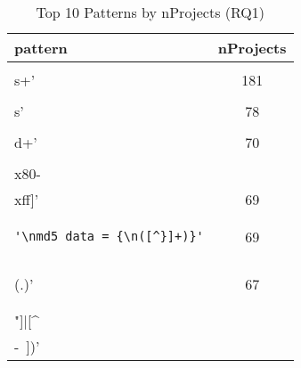 \begin{table}[tb]
\begin{center}
\caption{Top 10 Patterns by nProjects (RQ1)}
\label{table:topNW}
\begin{tabular}{lc}
\toprule
pattern & nProjects \\ 
\midrule
\begin{minipage}{2.3in}
\begin{verbatim}
'\\s+'\end{verbatim}
\end{minipage}
& 181 \\ 
\midrule
\begin{minipage}{2.3in}
\begin{verbatim}
'\\s'\end{verbatim}
\end{minipage}
& 78 \\ 
\midrule
\begin{minipage}{2.3in}
\begin{verbatim}
'\\d+'\end{verbatim}
\end{minipage}
& 70 \\ 
\midrule
\begin{minipage}{2.3in}
\begin{verbatim}
'[\\x80-\\xff]'\end{verbatim}
\end{minipage}
& 69 \\ 
\midrule
\begin{minipage}{2.3in}
\begin{verbatim}
'\nmd5_data = {\n([^}]+)}'\end{verbatim}
\end{minipage}
& 69 \\ 
\midrule
\begin{minipage}{2.3in}
\begin{verbatim}
'\\\\(.)'\end{verbatim}
\end{minipage}
& 67 \\ 
\midrule
\begin{minipage}{2.3in}
\begin{verbatim}
'([\\\\"]|[^\\ -~])'\end{verbatim}

\end{minipage}
\end{tabular}
\end{center}
\end{table}
